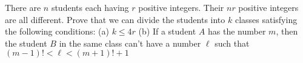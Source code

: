 There are $n$ students each having $r$ positive integers. Their $nr$ positive integers are all different. Prove that we can divide the students into $k$ classes satisfying the following conditions:
(a) $k \le 4r$
(b) If a student $A$ has the number $m$, then the student $B$ in the same class can't have a number $\ell$ such that $(m - 1)! < \ell < (m + 1)! + 1$